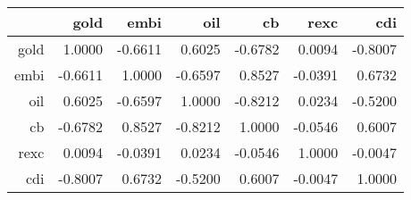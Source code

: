 \begin{table}[ht]
\centering
\begin{tabular}{rrrrrrr}
  \hline
 & gold & embi & oil & cb & rexc & cdi \\ 
  \hline
gold & 1.0000 & -0.6611 & 0.6025 & -0.6782 & 0.0094 & -0.8007 \\ 
  embi & -0.6611 & 1.0000 & -0.6597 & 0.8527 & -0.0391 & 0.6732 \\ 
  oil & 0.6025 & -0.6597 & 1.0000 & -0.8212 & 0.0234 & -0.5200 \\ 
  cb & -0.6782 & 0.8527 & -0.8212 & 1.0000 & -0.0546 & 0.6007 \\ 
  rexc & 0.0094 & -0.0391 & 0.0234 & -0.0546 & 1.0000 & -0.0047 \\ 
  cdi & -0.8007 & 0.6732 & -0.5200 & 0.6007 & -0.0047 & 1.0000 \\ 
   \hline
\end{tabular}
\end{table}
